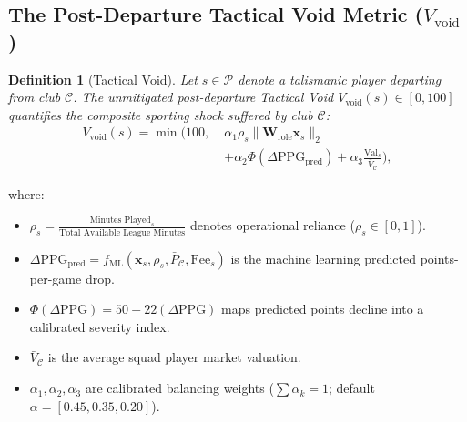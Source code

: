 \documentclass[10pt,journal,compsoc]{IEEEtran}
\newtheorem{definition}{Definition}
\begin{document}
\subsection{The Post-Departure Tactical Void Metric ($V_{\mathrm{void}}$)}
\begin{definition}[Tactical Void]
Let $s \in \mathcal{P}$ denote a talismanic player departing from club $\mathcal{C}$. The unmitigated post-departure Tactical Void $V_{\mathrm{void}}(s) \in [0, 100]$ quantifies the composite sporting shock suffered by club $\mathcal{C}$:
\begin{equation}
\label{eq:void}
\begin{aligned}
V_{\mathrm{void}}(s) = \min\Big(100, \; & \alpha_1 \rho_s \|\mathbf{W}_{\mathrm{role}} \mathbf{x}_s\|_2 \\
& + \alpha_2 \Phi(\Delta\mathrm{PPG}_{\mathrm{pred}}) + \alpha_3 \frac{\mathrm{Val}_s}{\bar{V}_{\mathcal{C}}}\Big),
\end{aligned}
\end{equation}
\end{definition}
where:
\begin{itemize}
    \item $\rho_s = \frac{\text{Minutes Played}_s}{\text{Total Available League Minutes}}$ denotes operational reliance ($\rho_s \in [0, 1]$).
    \item $\Delta\mathrm{PPG}_{\mathrm{pred}} = f_{\mathrm{ML}}(\mathbf{x}_s, \rho_s, \bar{P}_{\mathcal{C}}, \mathrm{Fee}_s)$ is the machine learning predicted points-per-game drop.
    \item $\Phi(\Delta\mathrm{PPG}) = 50 - 22(\Delta\mathrm{PPG})$ maps predicted points decline into a calibrated severity index.
    \item $\bar{V}_{\mathcal{C}}$ is the average squad player market valuation.
    \item $\alpha_1, \alpha_2, \alpha_3$ are calibrated balancing weights ($\sum \alpha_k = 1$; default $\alpha = [0.45, 0.35, 0.20]$).
\end{itemize}
\end{document}
